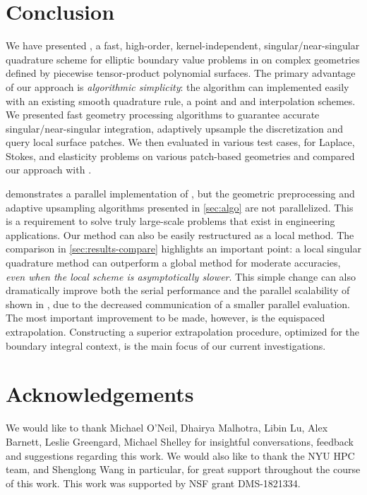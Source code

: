 \section{Conclusion\label{sec:conclusion}}
We have presented \qbkix, a fast, high-order, kernel-independent, singular/near-singular quadrature scheme for elliptic boundary value problems in \threed on complex geometries defined by piecewise tensor-product polynomial surfaces.
The primary advantage of our approach is \textit{algorithmic simplicity}: the algorithm can implemented easily with an existing smooth quadrature rule, a point \fmm and \oned and \twod interpolation schemes.
We presented fast geometry processing algorithms to guarantee accurate singular/near-singular integration, adaptively upsample the discretization and query local surface patches.
We then evaluated \qbkix in various test cases, for Laplace, Stokes, and elasticity problems on various patch-based geometries and compared our approach with \cite{YBZ}.

\cite{lu2019scalable} demonstrates a parallel implementation of \qbkix, but the geometric preprocessing and adaptive upsampling algorithms presented in \cref{sec:algo} are not parallelized.
This is a requirement to solve truly large-scale problems that exist in engineering applications.
Our method can also be easily restructured as a local method.
The comparison in \cref{sec:results-compare} highlights an important point: a local singular quadrature method can outperform a global method for moderate accuracies, \textit{even when the local scheme is asymptotically slower}.
This simple change can also dramatically improve both the serial performance and the parallel scalability of \qbkix shown in \cite{lu2019scalable}, due to the decreased communication of a smaller parallel \fmm evaluation.
The most important improvement to be made, however, is the equispaced extrapolation.
Constructing a superior extrapolation procedure, optimized for the boundary integral context, is the main focus of our current investigations.

\section{Acknowledgements}
We would like to thank Michael O'Neil, Dhairya Malhotra, Libin Lu, Alex Barnett, Leslie Greengard, Michael Shelley for insightful conversations, feedback and suggestions regarding this work. 
We would also like to thank the NYU HPC team, and Shenglong Wang in particular, for great support throughout the course of this work.
This work was supported by NSF grant DMS-1821334.

